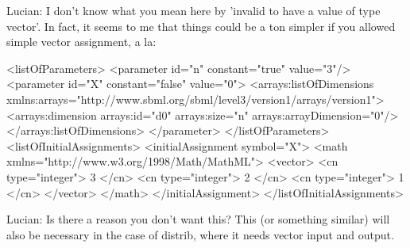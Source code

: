 {\color{red} Lucian: \notice I don't know what you mean here by 'invalid to have a value of type vector'.  In fact, it seems to me that things could be a ton simpler if you allowed simple vector assignment, a la:}

\begin{example}[showstringspaces=false]
<listOfParameters>
  <parameter id="n" constant="true" value="3"/>
  <parameter id="X" constant="false" value="0">
    <arrays:listOfDimensions xmlns:arrays="http://www.sbml.org/sbml/level3/version1/arrays/version1">
      <arrays:dimension arrays:id="d0" arrays:size="n" arrays:arrayDimension="0"/>
    </arrays:listOfDimensions>
  </parameter>
</listOfParameters>
<listOfInitialAssignments>
  <initialAssignment symbol="X">
    <math xmlns="http://www.w3.org/1998/Math/MathML">
        <vector>
          <cn type="integer"> 3 </cn>
          <cn type="integer"> 2 </cn>
          <cn type="integer"> 1 </cn>
        </vector>
    </math>
  </initialAssignment>
</listOfInitialAssignments>
\end{example}

{\color{red} Lucian: \notice Is there a reason you don't want this?  This (or something similar) will also be necessary in the case of distrib, where it needs vector input and output.}
